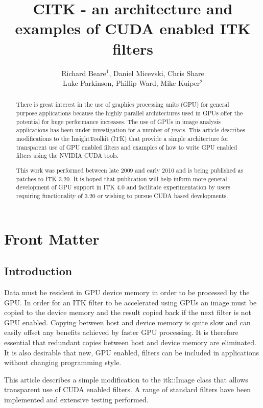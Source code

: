 \documentclass{InsightArticle}
\title{CITK - an architecture and examples of CUDA enabled ITK filters}
\author{Richard Beare{$^1$}, Daniel Micevski, Chris Share\\Luke Parkinson, Phillip Ward, Mike Kuiper{$^2$}}
\begin{document}
\maketitle

\ifhtml
\chapter*{Front Matter\label{front}}
\fi


\begin{abstract}
\noindent
There is great interest in the use of graphics processing units (GPU)
for general purpose applications because the highly parallel
architectures used in GPUs offer the potential for huge performance
increases. The use of GPUs in image analysis applications has been
under investigation for a number of years. This article describes
modifications to the InsightToolkit (ITK) that provide a simple
architecture for transparent use of GPU enabled filters and examples
of how to write GPU enabled filters using the NVIDIA CUDA tools.

This work was performed between late 2009 and early 2010 and is being
published as patches to ITK 3.20. It is hoped that publication will
help inform more general development of GPU support in ITK 4.0 and
facilitate experimentation by users requiring functionality of 3.20 or
wishing to pursue CUDA based developments.
\end{abstract}

\tableofcontents

\section{Introduction}
Data must be resident in GPU device memory in order to be processed by
the GPU. In order for an ITK filter to be accelerated using GPUs an
image must be copied to the device memory and the result copied back
if the next filter is not GPU enabled. Copying between host and device
memory is quite slow and can easily offset any benefits achieved by
faster GPU processing. It is therefore essential that redundant copies
between host and device memory are eliminated. It is also desirable
that new, GPU enabled, filters can be included in applications without
changing programming style.

This article describes a simple modification to the itk::Image class
that allows transparent use of CUDA enabled filters. A range of
standard filters have been implemented and extensive testing
performed.
\end{document}
